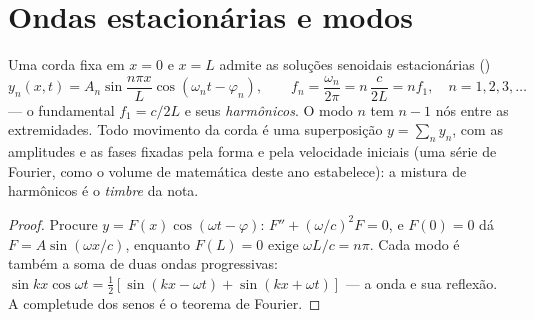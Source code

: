 \section{Ondas estacionárias e modos}

\begin{proposition}\label{prop:b2:waves-on-strings:modes}
Uma corda fixa em $x = 0$ e $x = L$ admite as soluções senoidais
estacionárias (\emph{})
\[
y_n(x, t) = A_n\sin\frac{n\pi x}{L}\cos(\omega_nt - \varphi_n) , \qquad
f_n = \frac{\omega_n}{2\pi} = n\,\frac{c}{2L} = n f_1 , \quad n = 1, 2, 3, \dots
\]
--- o fundamental $f_1 = c/2L$ e seus \emph{harmônicos}. O modo $n$ tem
$n - 1$ nós entre as extremidades. Todo movimento da corda é uma
superposição $y = \sum_ny_n$, com as amplitudes e as fases fixadas
pela forma e pela velocidade iniciais (uma série de Fourier, como o volume
de matemática deste ano estabelece): a mistura de harmônicos é o
\emph{timbre} da nota.
\end{proposition}

\begin{proof}
Procure $y = F(x)\cos(\omega t - \varphi)$: $F'' + (\omega/c)^2F = 0$, e $F(0) = 0$ dá
$F = A\sin(\omega x/c)$, enquanto $F(L) = 0$ exige $\omega L/c = n\pi$. Cada modo é
também a soma de duas ondas progressivas: $\sin kx\cos\omega t = \tfrac12[\sin(kx -
\omega t) + \sin(kx + \omega t)]$ --- a onda e sua reflexão. A
completude dos senos é o teorema de Fourier.
\end{proof}

